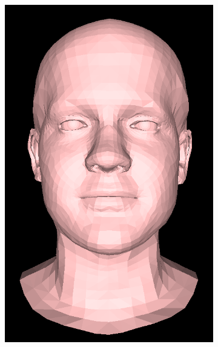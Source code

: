 \begin{figure}[h!]
\begin{subfigure}[b]{0.19\textwidth}
        \includegraphics[width=\textwidth]{figures/gen_sample/00003.png}
    \end{subfigure}
    \begin{subfigure}[b]{0.19\textwidth}

\end{subfigure}
\end{figure}
